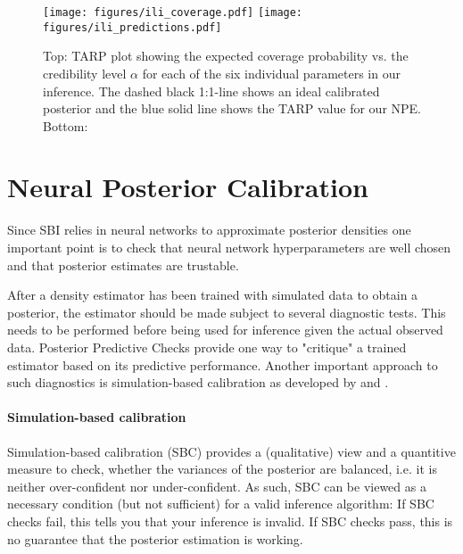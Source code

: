\documentclass{aa}
\begin{document}
\begin{appendix}
\begin{figure*}[]
     \centering
     \texttt{[image: figures/ili\_coverage.pdf]}
     \texttt{[image: figures/ili\_predictions.pdf]}
     \caption{Top: TARP plot showing the expected coverage probability vs. the credibility level $\alpha$ for each of the six individual parameters in our inference. The dashed black 1:1-line shows an ideal calibrated posterior and the blue solid line shows the TARP value for our NPE. Bottom: }
     \label{fig:tarp}
\end{figure*}

\section{Neural Posterior Calibration}
\label{sec:sbc}

Since SBI relies in neural networks to approximate posterior densities one important point is to check that neural network hyperparameters are well chosen and that posterior estimates are trustable.

After a density estimator has been trained with simulated data to obtain a posterior, the estimator should be made subject to several diagnostic tests. This needs to be performed before being used for inference given the actual observed data. Posterior Predictive Checks provide one way to "critique" a trained estimator based on its predictive performance. Another important approach to such diagnostics is simulation-based calibration as developed by \citet{Cook2006} and \citet{Talts2018}. 

\paragraph{Simulation-based calibration}
Simulation-based calibration (SBC) provides a (qualitative) view and a quantitive measure to check, whether the variances of the posterior are balanced, i.e. it is neither over-confident nor under-confident. As such, SBC can be viewed as a necessary condition (but not sufficient) for a valid inference algorithm: If SBC checks fail, this tells you that your inference is invalid. If SBC checks pass, this is no guarantee that the posterior estimation is working.


\end{appendix}
\end{document}
